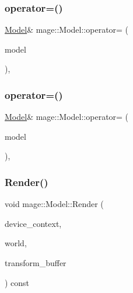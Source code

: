 \hypertarget{classmage_1_1_model_a563515c64ec39cfcda9f6ca37576391b}{}\label{classmage_1_1_model_a563515c64ec39cfcda9f6ca37576391b} 
\subsubsection{\texorpdfstring{operator=()}{operator=()}\hspace{0.1cm}{\footnotesize\ttfamily [1/2]}}
{\footnotesize\ttfamily \hyperlink{classmage_1_1_model}{Model}\& mage\+::\+Model\+::operator= (\begin{DoxyParamCaption}\item[{const \hyperlink{classmage_1_1_model}{Model} \&}]{model }\end{DoxyParamCaption})\hspace{0.3cm}{\ttfamily [private]}, {\ttfamily [delete]}}

\hypertarget{classmage_1_1_model_a084e30d15822bfefa79128f30a57cc02}{}\label{classmage_1_1_model_a084e30d15822bfefa79128f30a57cc02} 
\subsubsection{\texorpdfstring{operator=()}{operator=()}\hspace{0.1cm}{\footnotesize\ttfamily [2/2]}}
{\footnotesize\ttfamily \hyperlink{classmage_1_1_model}{Model}\& mage\+::\+Model\+::operator= (\begin{DoxyParamCaption}\item[{\hyperlink{classmage_1_1_model}{Model} \&\&}]{model }\end{DoxyParamCaption})\hspace{0.3cm}{\ttfamily [private]}, {\ttfamily [delete]}}

\hypertarget{classmage_1_1_model_ac377c873448cb5fd55b5c02b77452760}{}\label{classmage_1_1_model_ac377c873448cb5fd55b5c02b77452760} 
\subsubsection{\texorpdfstring{Render()}{Render()}}
{\footnotesize\ttfamily void mage\+::\+Model\+::\+Render (\begin{DoxyParamCaption}\item[{I\+D3\+D11\+Device\+Context2 \&}]{device\+\_\+context,  }\item[{const \hyperlink{classmage_1_1_world}{World} \&}]{world,  }\item[{const \hyperlink{structmage_1_1_transform_buffer}{Transform\+Buffer} \&}]{transform\+\_\+buffer }\end{DoxyParamCaption}) const}

